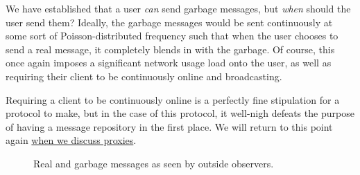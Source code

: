 We have established that a user \emph{can} send garbage messages, but \emph{when} should the user send them? Ideally, the garbage messages would be sent continuously at some sort of Poisson-distributed frequency such that when the user chooses to send a real message, it completely blends in with the garbage. Of course, this once again imposes a significant network usage load onto the user, as well as requiring their client to be continuously online and broadcasting.

Requiring a client to be continuously online is a perfectly fine stipulation for a protocol to make, but in the case of this protocol, it well-nigh defeats the purpose of having a message repository in the first place. We will return to this point again \hyperref[proxies]{when we discuss proxies}.

\begin{figure}[h]
    \centering
    \caption{Real and garbage messages as seen by outside observers.}
    \label{fig:garbage_messages}
\end{figure}

